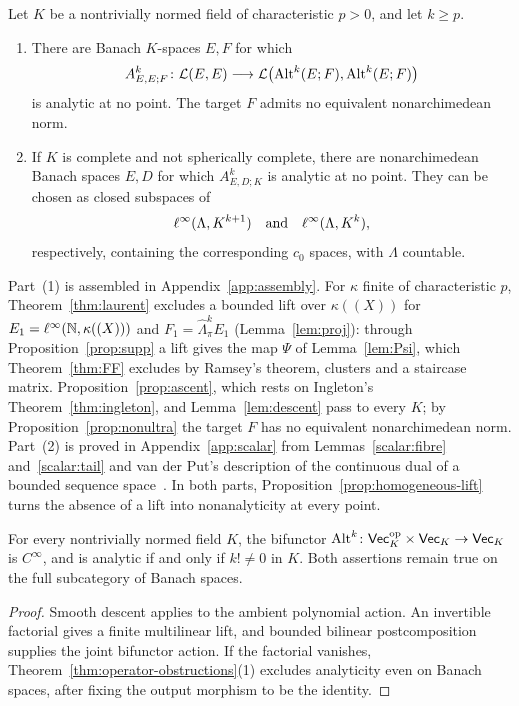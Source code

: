 \begin{theorem}\label{thm:operator-obstructions}
Let $K$ be a nontrivially normed field of characteristic $p>0$, and let $k\ge p$.
\begin{enumerate}
\item There are Banach $K$\nobreakdash-spaces $E,F$ for which
\[
 A^k_{E,E;F}\colon\mathcal L(E,E)\longrightarrow
 \mathcal L\bigl(\operatorname{Alt}^k(E;F),\operatorname{Alt}^k(E;F)\bigr)
\]
is analytic at no point. The target $F$ admits no equivalent nonarchimedean norm.
\item If $K$ is complete and not spherically complete, there are nonarchimedean Banach spaces $E,D$ for which $A^k_{E,D;K}$ is analytic at no point. They can be chosen as closed subspaces of
\[
 \ell^\infty(\Lambda,K^{k+1})\quad\text{and}\quad\ell^\infty(\Lambda,K^k),
\]
respectively, containing the corresponding $c_0$ spaces, with $\Lambda$ countable.
\end{enumerate}
\end{theorem}

Part~(1) is assembled in Appendix~\ref{app:assembly}. For $\kappa$ finite of characteristic $p$, Theorem~\ref{thm:laurent}
excludes a bounded lift over $\kappa((X))$ for $E_1=\ell^\infty(\mathbb N,\kappa((X)))$ and $F_1=\widehat\Lambda^k_\pi E_1$
(Lemma~\ref{lem:proj}): through Proposition~\ref{prop:supp} a lift gives the map $\Psi$ of Lemma~\ref{lem:Psi}, which
Theorem~\ref{thm:FF} excludes by Ramsey's theorem, clusters and a staircase matrix. Proposition~\ref{prop:ascent}, which
rests on Ingleton's Theorem~\ref{thm:ingleton}, and Lemma~\ref{lem:descent} pass to every $K$; by
Proposition~\ref{prop:nonultra} the target $F$ has no equivalent nonarchimedean norm. Part~(2) is proved in
Appendix~\ref{app:scalar} from Lemmas~\ref{scalar:fibre} and~\ref{scalar:tail} and van der Put's description of the
continuous dual of a bounded sequence space~\cite{VdP}. In both parts, Proposition~\ref{prop:homogeneous-lift} turns the
absence of a lift into nonanalyticity at every point.

\begin{corollary}\label{cor:classification}
For every nontrivially normed field $K$, the bifunctor
$\operatorname{Alt}^k\colon\mathsf{Vec}_K^{\mathrm{op}}\times\mathsf{Vec}_K\to\mathsf{Vec}_K$
is $C^\infty$, and is analytic if and only if $k!\ne0$ in $K$.
Both assertions remain true on the full subcategory of Banach spaces.
\end{corollary}
\begin{proof}
Smooth descent applies to the ambient polynomial action. An invertible factorial gives a finite
multilinear lift, and bounded bilinear postcomposition supplies the joint bifunctor action.
If the factorial vanishes, Theorem~\ref{thm:operator-obstructions}(1) excludes analyticity even on
Banach spaces, after fixing the output morphism to be the identity.
\end{proof}

